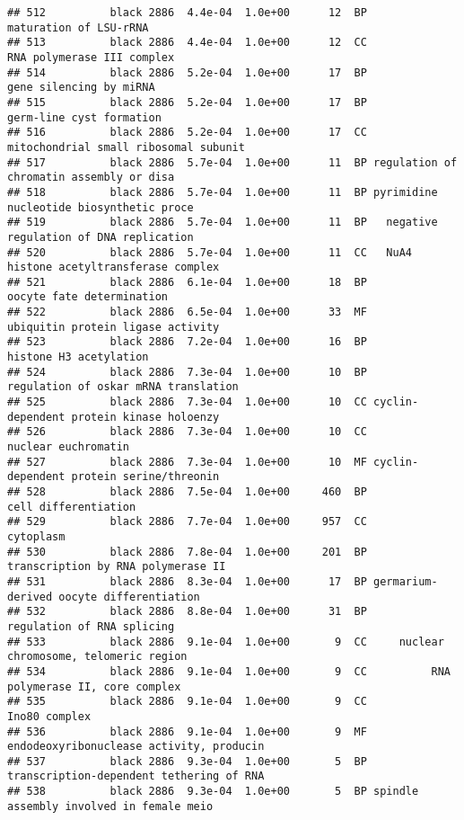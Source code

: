 \documentclass[]{article}
\begin{document}
\begin{verbatim}
## 512          black 2886  4.4e-04  1.0e+00      12  BP                   maturation of LSU-rRNA
## 513          black 2886  4.4e-04  1.0e+00      12  CC               RNA polymerase III complex
## 514          black 2886  5.2e-04  1.0e+00      17  BP                  gene silencing by miRNA
## 515          black 2886  5.2e-04  1.0e+00      17  BP                 germ-line cyst formation
## 516          black 2886  5.2e-04  1.0e+00      17  CC    mitochondrial small ribosomal subunit
## 517          black 2886  5.7e-04  1.0e+00      11  BP regulation of chromatin assembly or disa
## 518          black 2886  5.7e-04  1.0e+00      11  BP pyrimidine nucleotide biosynthetic proce
## 519          black 2886  5.7e-04  1.0e+00      11  BP   negative regulation of DNA replication
## 520          black 2886  5.7e-04  1.0e+00      11  CC   NuA4 histone acetyltransferase complex
## 521          black 2886  6.1e-04  1.0e+00      18  BP                oocyte fate determination
## 522          black 2886  6.5e-04  1.0e+00      33  MF        ubiquitin protein ligase activity
## 523          black 2886  7.2e-04  1.0e+00      16  BP                   histone H3 acetylation
## 524          black 2886  7.3e-04  1.0e+00      10  BP     regulation of oskar mRNA translation
## 525          black 2886  7.3e-04  1.0e+00      10  CC cyclin-dependent protein kinase holoenzy
## 526          black 2886  7.3e-04  1.0e+00      10  CC                      nuclear euchromatin
## 527          black 2886  7.3e-04  1.0e+00      10  MF cyclin-dependent protein serine/threonin
## 528          black 2886  7.5e-04  1.0e+00     460  BP                     cell differentiation
## 529          black 2886  7.7e-04  1.0e+00     957  CC                                cytoplasm
## 530          black 2886  7.8e-04  1.0e+00     201  BP       transcription by RNA polymerase II
## 531          black 2886  8.3e-04  1.0e+00      17  BP germarium-derived oocyte differentiation
## 532          black 2886  8.8e-04  1.0e+00      31  BP               regulation of RNA splicing
## 533          black 2886  9.1e-04  1.0e+00       9  CC     nuclear chromosome, telomeric region
## 534          black 2886  9.1e-04  1.0e+00       9  CC          RNA polymerase II, core complex
## 535          black 2886  9.1e-04  1.0e+00       9  CC                            Ino80 complex
## 536          black 2886  9.1e-04  1.0e+00       9  MF endodeoxyribonuclease activity, producin
## 537          black 2886  9.3e-04  1.0e+00       5  BP transcription-dependent tethering of RNA
## 538          black 2886  9.3e-04  1.0e+00       5  BP spindle assembly involved in female meio

\end{verbatim}
\end{document}
